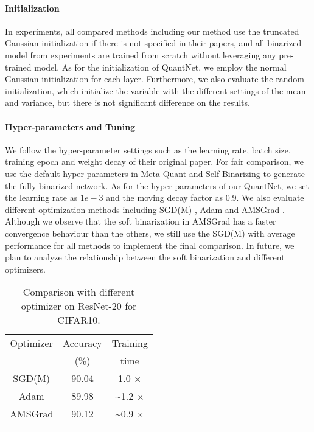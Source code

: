 \documentclass[runningheads]{llncs}
\begin{document}
\paragraph{\textbf{Initialization}}
In experiments, all compared methods including our method
use the truncated Gaussian initialization if there is not specified in their papers,
and all binarized model from experiments are trained from scratch without leveraging any pre-trained model.
As for the initialization of QuantNet, we employ the normal Gaussian initialization for each layer.
Furthermore, we also evaluate the random initialization, which
initialize the variable with the different settings of the mean and variance,
but there is not significant difference on the results.

\paragraph{\textbf{Hyper-parameters and Tuning}}


We follow the hyper-parameter settings such as the learning rate, batch size,
training epoch and weight decay of their original paper.
For fair comparison, we use the default hyper-parameters
in Meta-Quant \cite{chen2019meta} and Self-Binarizing \cite{lahoud2019self} to generate the fully binarized network.
As for the hyper-parameters of our QuantNet,
we set the learning rate as $1e-3$ and the moving decay factor as $0.9$.
We also evaluate different optimization methods including
SGD(M) \cite{sgd1951}, Adam \cite{adam2014} and AMSGrad \cite{amsgrad2018}.
Although we observe that the soft binarization in AMSGrad
has a faster convergence behaviour than the others,
we still use the SGD(M) with average performance for all methods to implement the final comparison.
In future, we plan to analyze the relationship between the soft binarization and different optimizers.
\begin{table}[htb]
\begin{center}
	\centering
    \begin{tabular}{ccc}
    \hline
    Optimizer       & Accuracy    & Training   \\
                    &  (\%)       &  time      \\
    \hline
    SGD(M)         & 90.04     &   1.0 $\times$     \\
    Adam           & 89.98     &   \textasciitilde 1.2 $\times$     \\
    AMSGrad        & 90.12     &   \textasciitilde 0.9 $\times$     \\
    \hline
    \noalign{\smallskip}
    \end{tabular}
    \caption{Comparison with different optimizer on ResNet-20 for CIFAR10.}
    \label{tab:perf_op}
\end{center}
\end{table}
\end{document}
